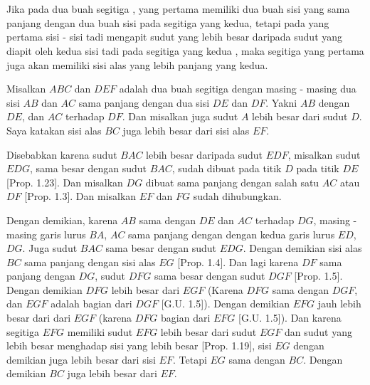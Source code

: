 \documentclass[a4paper]{book}
\begin{document}
\section*{\centering \thesection}
Jika pada dua buah segitiga , yang pertama memiliki dua buah sisi yang sama 
panjang  dengan dua buah sisi pada segitiga yang kedua, tetapi pada yang pertama 
sisi - sisi tadi mengapit sudut yang lebih besar daripada sudut yang diapit oleh 
kedua sisi tadi pada segitiga yang kedua , maka segitiga yang pertama juga akan
 memiliki sisi alas yang lebih panjang yang kedua.
\begin{center}
\end{center} 

Misalkan $ABC$ dan $DEF$ adalah dua buah segitiga dengan masing - masing 
dua sisi $AB$ dan $AC$ sama panjang dengan dua sisi $DE$ dan $DF$. Yakni
$AB$ dengan $DE$, dan $AC$ terhadap $DF$. Dan misalkan juga sudut $A$ 
lebih besar dari sudut $D$. Saya katakan sisi alas $BC$ juga lebih besar
dari sisi alas $EF$.

Disebabkan karena sudut $BAC$ lebih besar daripada sudut $EDF$, misalkan
sudut $EDG$, sama besar dengan sudut $BAC$, sudah dibuat pada titik $D$
pada titik $DE$ [Prop. 1.23]. Dan misalkan $DG$ dibuat sama panjang
dengan salah satu $AC$ atau $DF$ [Prop. 1.3]. Dan misalkan $EF$ dan 
$FG$ sudah dihubungkan.

Dengan demikian, karena $AB$ sama dengan $DE$ dan $AC$ terhadap $DG$,
masing - masing garis lurus $BA$, $AC$ sama panjang dengan  dengan
kedua garis lurus $ED$, $DG$. Juga sudut $BAC$ sama besar dengan sudut
$EDG$. Dengan demikian sisi alas $BC$ sama panjang dengan sisi alas
$EG$ [Prop. 1.4]. Dan lagi karena $DF$ sama panjang dengan $DG$, sudut
$DFG$ sama besar dengan sudut $DGF$ [Prop. 1.5]. Dengan demikian $DFG$
lebih besar dari $EGF$ (Karena $DFG$ sama dengan $DGF$, dan $EGF$
adalah bagian dari $DGF$ [G.U. 1.5]). Dengan demikian $EFG$ jauh lebih
besar dari dari $EGF$ (karena $DFG$ bagian dari $EFG$ [G.U. 1.5]). Dan
karena segitiga $EFG$ memiliki sudut $EFG$ lebih besar dari sudut
$EGF$ dan sudut yang lebih besar menghadap sisi yang lebih besar 
[Prop. 1.19], sisi $EG$ dengan demikian juga lebih besar dari
sisi $EF$. Tetapi $EG$ sama dengan $BC$. Dengan demikian $BC$ juga
lebih besar dari $EF$.
\end{document}
